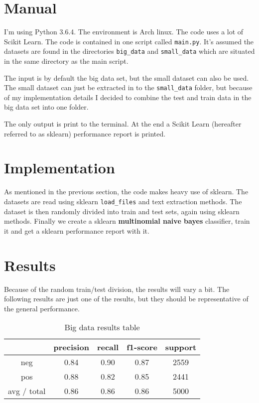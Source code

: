 \section*{Manual}

I'm using Python 3.6.4. The environment is Arch linux. The code uses a lot of
Scikit Learn. The code is contained in one script called \verb|main.py|. It's
assumed the datasets are found in the directories \verb|big_data| and
\verb|small_data| which are situated in the same directory as the main script.

The input is by default the big data set, but the small dataset can also be
used. The small dataset can just be extracted in to the \verb|small_data|
folder, but because of my implementation details I decided to combine the test
and train data in the big data set into one folder.

The only output is print to the terminal. At the end a Scikit Learn (hereafter
referred to as sklearn) performance report is printed.


\section*{Implementation}

As mentioned in the previous section, the code makes heavy use of sklearn. The
datasets are read using sklearn \verb|load_files| and text extraction methods.
The dataset is then randomly divided into train and test sets, again using
sklearn methods. Finally we create a sklearn \textbf{multinomial naive bayes}
classifier, train it and get a sklearn performance report with it.


\section*{Results}

Because of the random train/test division, the results will vary a bit. The
following results are just one of the results, but they should be
representative of the general performance.

\begin{table}[H]
  \centering
  \caption{Big data results table}\label{tab:big}
  \begin{tabular}{c c c c c}
    \toprule
    &   precision   &   recall  &   f1-score    &   support \\
    \midrule
    neg         &   0.84        &   0.90    &   0.87        &   2559 \\
    pos         &   0.88        &   0.82    &   0.85        &   2441 \\
    avg / total &   0.86        &   0.86    &   0.86        &   5000 \\
    \bottomrule

  \end{tabular}
\end{table}


